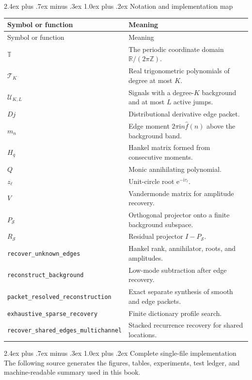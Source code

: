 \documentclass[11pt,oneside]{book}
\makeatletter
\renewcommand\chapter{\@startsection{chapter}{0}{\z@}%
  {2.4ex plus .7ex minus .3ex}%
  {1.0ex plus .2ex}%
  {\normalfont\LARGE\bfseries\color{Ink}}}
\theoremstyle{remark}
\newcommand{\Torus}{\mathbb T}
\newcommand{\R}{\mathbb R}
\newcommand{\Z}{\mathbb Z}
\newcommand{\e}{\mathrm e}
\newcommand{\ii}{\mathrm i}
\newcommand{\RS}{R_{\mathcal S}}
\newcommand{\PS}{P_{\mathcal S}}
\newcommand{\EdgeClass}{\mathcal U_{K,L}}
\makeatother
\begin{document}
\chapter{Notation and implementation map}
\begin{longtable}{L{0.32\textwidth}L{0.57\textwidth}}
\toprule
Symbol or function & Meaning\\
\midrule
\endfirsthead
\toprule
Symbol or function & Meaning\\
\midrule
\endhead
\(\Torus\) & The periodic coordinate domain \(\R/(2\pi\Z)\).\\
\(\mathcal T_K\) & Real trigonometric polynomials of degree at most \(K\).\\
\(\EdgeClass\) & Signals with a degree-\(K\) background and at most \(L\) active jumps.\\
\(D j\) & Distributional derivative edge packet.\\
\(m_n\) & Edge moment \(2\pi\ii n\widehat f(n)\) above the background band.\\
\(H_q\) & Hankel matrix formed from consecutive moments.\\
\(Q\) & Monic annihilating polynomial.\\
\(z_\ell\) & Unit-circle root \(\e^{-\ii\tau_\ell}\).\\
\(V\) & Vandermonde matrix for amplitude recovery.\\
\(\PS\) & Orthogonal projector onto a finite background subspace.\\
\(\RS\) & Residual projector \(I-\PS\).\\
\nolinkurl{recover_unknown_edges} & Hankel rank, annihilator, roots, and amplitudes.\\
\nolinkurl{reconstruct_background} & Low-mode subtraction after edge recovery.\\
\nolinkurl{packet_resolved_reconstruction} & Exact separate synthesis of smooth and edge packets.\\
\nolinkurl{exhaustive_sparse_recovery} & Finite dictionary profile search.\\
\nolinkurl{recover_shared_edges_multichannel} & Stacked recurrence recovery for shared locations.\\
\bottomrule
\end{longtable}

\chapter{Complete single-file implementation}
The following source generates the figures, tables, experiments, test ledger, and machine-readable summary used in this book.
\end{document}
